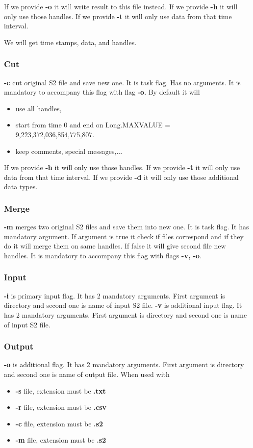 \documentclass[english]{article}
\begin{document}
If we provide \textbf{-o} it will write result to this file instead.
If we provide \textbf{-h} it will only use those handles.
If we provide \textbf{-t} it will only use data from that time interval.

We will get time stamps, data, and handles.

\subsubsection{Cut}
 \textbf{-c} cut original S2 file and save new one. It is task flag. Has no arguments. It is mandatory to accompany this flag with flag \textbf{-o}.
By default it will 
\begin{itemize}
\item use all handles,
\item start from time 0 and end on Long.MAXVALUE = 9,223,372,036,854,775,807.
\item keep comments, special messages,...
\end{itemize}

If we provide \textbf{-h} it will only use those handles.
If we provide \textbf{-t} it will only use data from that time interval.
If we provide \textbf{-d} it will only use those additional data types.

\subsubsection{Merge}
 \textbf{-m} merges two original S2 files and save them into new one. It is task flag. It has mandatory argument. If argument is true it check if files correspond and if they do it will merge them on same handles. If false it will give second file new handles. It is mandatory to accompany this flag with flags \textbf{-v, -o}.


\subsubsection{Input}

 \textbf{-i} is primary input flag. It has 2 mandatory arguments. First argument is directory and second one is name of input S2 file.
\textbf{-v} is additional input flag. It has 2 mandatory arguments.  First argument is directory and second one is name of input S2 file.

\subsubsection{Output}
\textbf{-o} is additional flag. It has 2 mandatory arguments. First argument is directory and second one is name of output file.
When used with
\begin{itemize}
\item \textbf{-s} file, extension must be \textbf{.txt}
\item \textbf{-r} file, extension must be \textbf{.csv}
\item \textbf{-c} file, extension must be \textbf{.s2}
\item \textbf{-m} file, extension must be \textbf{.s2}
\end{itemize}
\end{document}
